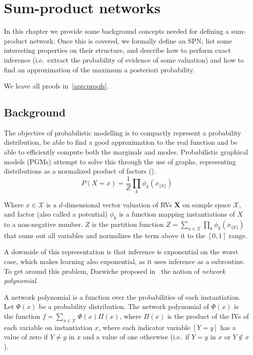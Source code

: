 \chapter{Sum-product networks}\label{chp:spn}

In this chapter we provide some background concepts needed for defining a sum-product network. Once
this is covered, we formally define an SPN, list some interesting properties on their structure,
and describe how to perform exact inference (i.e.\ extract the probability of evidence of some
valuation) and how to find an approximation of the maximum a posteriori probability.

We leave all proofs in~\autoref{app:proofs}.

\section{Background}

The objective of probabilistic modelling is to compactly represent a probability distribution, be
able to find a good approximation to the real function and be able to efficiently compute both
the marginals and modes. Probabilistic graphical models (PGMs) attempt to solve this through the
use of graphs, representing distributions as a normalized product of factors (\cite{pearl-1988}).
\begin{equation*}
  P(X=x)=\frac{1}{Z}\prod_k \phi_k(x_{\{k\}})
\end{equation*}

Where $x\in\mathcal{X}$ is a $d$-dimensional vector valuation of RVs $\mathbf{X}$ on sample space
$\mathcal{X}$, and factor (also called a potential) $\phi_k$ is a function mapping instantiations
of $X$ to a non-negative number. $Z$ is the partition function $Z=\sum_{x\in\mathcal{X}} \prod_k
\phi_k(x_{\{k\}})$ that sums out all variables and normalizes the term above it to the $[0,1]$
range.

A downside of this representation is that inference is exponential on the worst case, which makes
learning also exponential, as it uses inference as a subroutine. To get around this problem,
Darwiche proposed in~\cite{diff-approach-darwiche} the notion of \textit{network polynomial}.

A network polynomial is a function over the probabilities of each instantiation. Let $\Phi(x)$ be a
probability distribution. The network polynomial of $\Phi(x)$ is the function
$f=\sum_{x\in\mathcal{X}}\Phi(x)\Pi(x)$, where $\Pi(x)$ is the product of the IVs of each variable
on instantiation $x$, where each indicator variable $[Y=y]$ has a value of zero if $Y\neq y$ in $x$
and a value of one otherwise (i.e.\ if $Y=y$ in $x$ or $Y\not\in x$).

